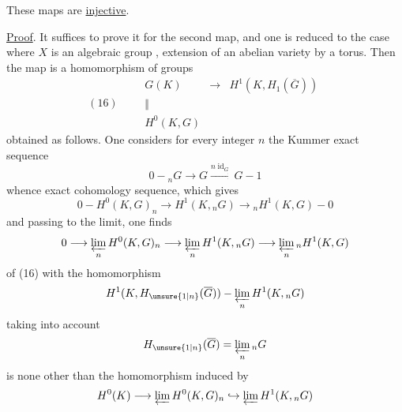 These maps are \uline{injective}.

\uline{Proof}. It suffices to prove it for the second map, and one is reduced to the case where $X$ is  an algebraic group , extension of an abelian variety by a torus. Then the map is a homomorphism of groups
\[
(16)\qquad
\begin{array}{ccl}
G(K)&\longrightarrow&H^1(K,H_1(\overline G))\\[-.5ex]
\Vert&&\\[-.5ex]
H^0(K,G)&&
\end{array}
\]
obtained as follows. One considers for every integer $n$ the Kummer exact sequence
\[
0-{}_nG\longrightarrow G\xrightarrow{n\operatorname{id}_G}G-1
\]
whence exact cohomology sequence, which gives
\[
0-H^0(K,G)_n\longrightarrow H^1(K,{}_nG)\longrightarrow {}_nH^1(K,G)-0
\]
and passing to the limit, one finds
\[
0\longrightarrow\varprojlim_n H^0(K,G)_n\longrightarrow\varprojlim_n H^1(K,{}_nG)\longrightarrow\varprojlim_n {}_nH^1(K,G)
\]
  of (16) with the   homomorphism
\[
H^1(K,H_{\unsure{1|n}}(\overline G))-\varprojlim_n H^1(K,{}_nG)
\]
taking into account
\[
H_{\unsure{1|n}}(\overline G)=\varprojlim_n {}_nG
\]
is none other than the homomorphism induced by
\[
H^0(K)\longrightarrow\varprojlim H^0(K,G)_n\hookrightarrow\varprojlim H^1(K,{}_nG)
\]
